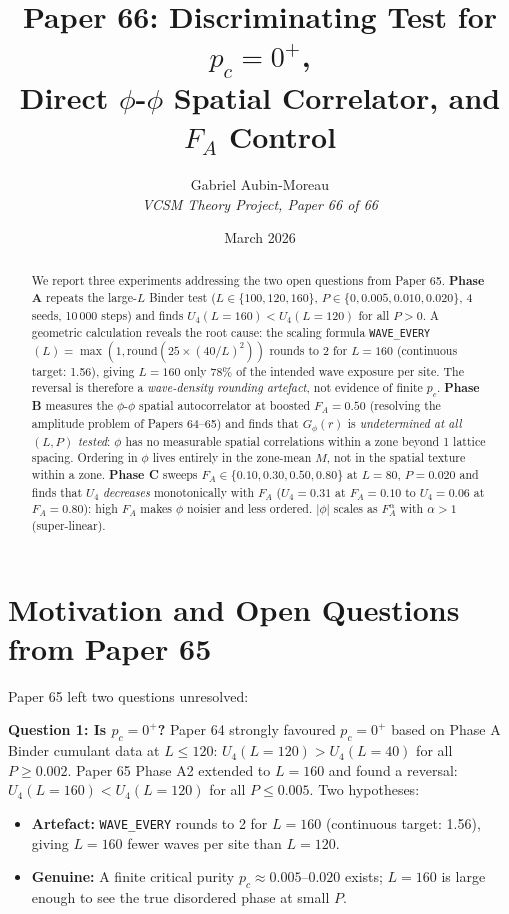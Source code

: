 \documentclass[12pt,a4paper]{article}
\title{\textbf{Paper 66: Discriminating Test for $p_c = 0^+$, \\
Direct $\phi$-$\phi$ Spatial Correlator, and $F_A$ Control}}
\author{Gabriel Aubin-Moreau \\ \textit{VCSM Theory Project, Paper 66 of 66}}
\date{March 2026}
\begin{document}
\maketitle

\begin{abstract}
We report three experiments addressing the two open questions from Paper 65.
\textbf{Phase A} repeats the large-$L$ Binder test ($L \in \{100,120,160\}$,
$P \in \{0, 0.005, 0.010, 0.020\}$, 4 seeds, 10\,000 steps) and finds
$U_4(L=160) < U_4(L=120)$ for all $P > 0$.
A geometric calculation reveals the root cause: the scaling formula
\texttt{WAVE\_EVERY}$(L) = \max(1, \text{round}(25 \times (40/L)^2))$ rounds to 2
for $L=160$ (continuous target: 1.56), giving $L=160$ only 78\% of the intended
wave exposure per site.  The reversal is therefore a \emph{wave-density rounding
artefact}, not evidence of finite $p_c$.
\textbf{Phase B} measures the $\phi$-$\phi$ spatial autocorrelator at boosted
$F_A = 0.50$ (resolving the amplitude problem of Papers 64--65) and finds that
$G_\phi(r)$ is \emph{undetermined at all $(L, P)$ tested}: $\phi$ has no
measurable spatial correlations within a zone beyond 1 lattice spacing.
Ordering in $\phi$ lives entirely in the zone-mean $M$, not in the spatial
texture within a zone.
\textbf{Phase C} sweeps $F_A \in \{0.10, 0.30, 0.50, 0.80\}$ at $L=80$,
$P=0.020$ and finds that $U_4$ \emph{decreases} monotonically with $F_A$
($U_4 = 0.31$ at $F_A=0.10$ to $U_4 = 0.06$ at $F_A=0.80$): high $F_A$
makes $\phi$ noisier and less ordered.  $|\phi|$ scales as $F_A^\alpha$ with
$\alpha > 1$ (super-linear).
\end{abstract}

\section{Motivation and Open Questions from Paper 65}

Paper 65 left two questions unresolved:

\textbf{Question 1: Is $p_c = 0^+$?}
Paper 64 strongly favoured $p_c = 0^+$ based on Phase A Binder cumulant data
at $L \le 120$: $U_4(L=120) > U_4(L=40)$ for all $P \ge 0.002$.
Paper 65 Phase A2 extended to $L = 160$ and found a reversal:
$U_4(L=160) < U_4(L=120)$ for all $P \le 0.005$.
Two hypotheses:
\begin{itemize}
  \item \textbf{Artefact:} \texttt{WAVE\_EVERY} rounds to 2 for $L=160$
    (continuous target: 1.56), giving $L=160$ fewer waves per site than $L=120$.
  \item \textbf{Genuine:} A finite critical purity $p_c \approx 0.005$--$0.020$
    exists; $L=160$ is large enough to see the true disordered phase at small $P$.
\end{itemize}
\end{document}
